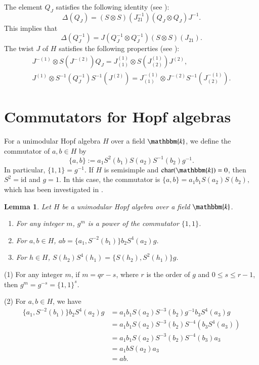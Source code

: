 \documentclass[11pt]{amsart}
\newtheorem{lem}[thm]{Lemma}
\numberwithin{equation}{section}
\begin{document}
The element $Q_J$ satisfies the following identity (see \cite[Eq. (5)]{AEGN}):
\begin{equation}\label{equ002}
\Delta(Q_J)=(S\otimes S)(J^{-1}_{21})(Q_J\otimes Q_J)J^{-1}.
\end{equation}
This implies that
\begin{equation}\label{equu00003}
\Delta(Q_J^{-1})=J(Q_J^{-1}\otimes Q_J^{-1})(S\otimes S)(J_{21}).
\end{equation}
The twist $J$ of $H$ satisfies the following properties (see \cite[Lemma 2.4]{AEGN}):
\begin{gather}
\label{eqq11}J^{-(1)}\otimes S(J^{-(2)})Q_J=J^{(1)}_{(1)}\otimes S(J^{(1)}_{(2)})J^{(2)},\\
\label{eqq1}J^{(1)}\otimes S^{-1}(Q_J^{-1})S^{-1}(J^{(2)})=J^{-(1)}_{(1)}\otimes J^{-(2)}S^{-1}(J^{-(1)}_{(2)}).
\end{gather}





\section{\bf Commutators for Hopf algebras}

For a unimodular Hopf algebra $H$ over a field $\mathbbm{k}$,
we define the commutator of  $a,b\in H$ by
$$\{a,b\}:=a_{1}S^2(b_{1})S(a_{2})S^{-1}(b_{2})g^{-1}.$$
In particular, $\{1,1\}=g^{-1}$.
If $H$ is semisimple and $\operatorname{char}(\mathbbm{k})=0$, then $S^2=\mathrm{id}$ and $g=1$. In this case, the commutator is $\{a,b\}=a_{1}b_{1}S(a_{2})S(b_{2}),$ which has been investigated in \cite{Cohen, CW, CW1}. 

\begin{lem}\label{lem1}
Let $H$ be a unimodular Hopf algebra over a field $\mathbbm{k}$.
\begin{enumerate}
  \item For any integer $m$, $g^m$ is a power of the commutator $\{1,1\}$.
  \item For $a,b\in H$, $ab=\{a_1,S^{-2}(b_1)\}b_2S^4(a_2)g$. 
  \item For $h\in H$, $S(h_2)S^4(h_1)=\{S(h_2),S^2(h_1)\}g$.
\end{enumerate}
\end{lem}
\proof
(1) For any integer $m$, if $m=qr-s$, where $r$ is the order of $g$ and $0\leq s\leq r-1$, then $g^m=g^{-s}=\{1,1\}^{s}$.

(2)  For $a,b\in H$, we have
\begin{align*}
\{a_1,S^{-2}(b_1)\}b_2S^4(a_2)g&=a_1b_1S(a_2)S^{-3}(b_2)g^{-1}b_3S^{4}(a_3)g\\
&=a_1b_1S(a_2)S^{-3}(b_2)S^{-4}(b_3S^{4}(a_3))\\
&=a_1b_1S(a_2)S^{-3}(b_2)S^{-4}(b_3)a_3\\
&=a_1bS(a_2)a_3\\
&=ab.
\end{align*}
\end{document}
